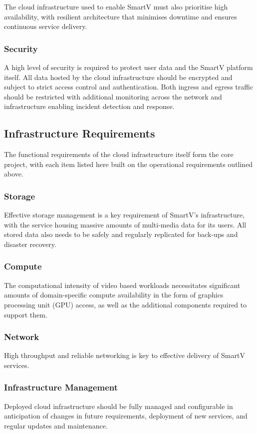 The cloud infrastructure used to enable SmartV must also prioritise high availability, with resilient architecture that minimises downtime and ensures continuous service delivery. 

\subsubsection*{Security}

A high level of security is required to protect user data and the SmartV platform itself. All data hosted by the cloud infrastructure should be encrypted and subject to strict access control and authentication. Both ingress and egress traffic should be restricted with additional monitoring across the network and infrastructure enabling incident detection and response. 

\subsection{Infrastructure Requirements}

The functional requirements of the cloud infrastructure itself form the core project, with each item listed here built on the operational requirements outlined above.

\subsubsection*{Storage}

Effective storage management is a key requirement of SmartV's infrastructure, with the service housing massive amounts of multi-media data for its users. All stored data also needs to be safely and regularly replicated for back-ups and disaster recovery.


\subsubsection*{Compute}

The computational intensity of video based workloads necessitates significant amounts of domain-specific compute availability in the form of graphics processing unit (GPU) access, as well as the additional components required to support them. 

\subsubsection*{Network}

High throughput and reliable networking is key to effective delivery of SmartV services.

\subsubsection*{Infrastructure Management}

Deployed cloud infrastructure should be fully managed and configurable in anticipation of changes in future requirements, deployment of new services, and regular updates and maintenance.